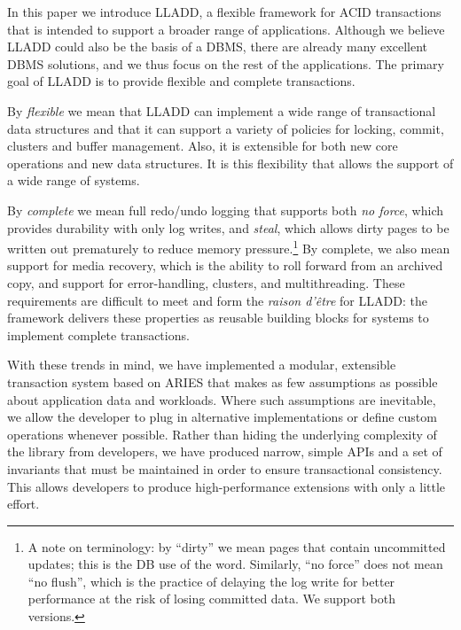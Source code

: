 \documentclass[10pt,letterpaper,twocolumn,english]{article}
\newcommand{\yad}{LLADD\xspace}
\begin{document}
In this paper we introduce \yad, a flexible framework for ACID
transactions that is intended to support a broader range of
applications.  Although we believe \yad could also be the basis of a
DBMS, there are already many excellent DBMS solutions, and we thus
focus on the rest of the applications.  The primary goal of \yad is to
provide flexible and complete transactions.

By {\em flexible} we mean that \yad can implement a wide range of
transactional data structures and that it can support a variety of
policies for locking, commit, clusters and buffer management. Also,
it is extensible for both new core operations and new data
structures.  It is this flexibility that allows the support of a wide
range of systems.

By {\em complete} we mean full redo/undo logging that supports both
{\em no force}, which provides durability with only log writes, and
{\em steal}, which allows dirty pages to be written out prematurely to
reduce memory pressure.\footnote{A note on terminology: by ``dirty''
we mean pages that contain uncommitted updates; this is the DB use of
the word. Similarly, ``no force'' does not mean ``no flush'', which is
the practice of delaying the log write for better performance at the
risk of losing committed data. We support both versions.} By complete,
we also mean support for media recovery, which is the ability to roll
forward from an archived copy, and support for error-handling,
clusters, and multithreading.  These requirements are difficult to
meet and form the {\em raison d'\^{e}tre} for \yad: the framework delivers
these properties as reusable building blocks for systems to implement 
complete transactions.

With these trends in mind, we have implemented a modular, extensible
transaction system based on ARIES that makes as few assumptions as
possible about application data and workloads. Where such
assumptions are inevitable, we allow 
the developer to plug in alternative implementations or
define custom operations whenever possible. Rather than hiding the underlying complexity
of the library from developers, we have produced narrow, simple APIs
and a set of invariants that must be maintained in order to ensure
transactional consistency.  This allows developers to produce
high-performance extensions with only a little effort.  
\end{document}
